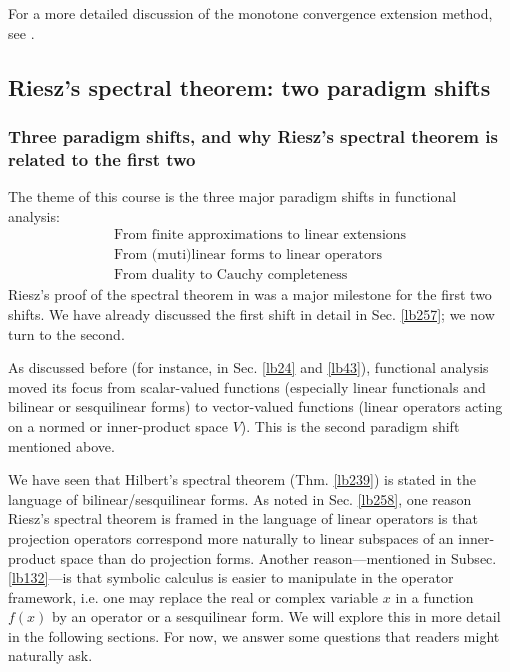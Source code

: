 \documentclass[12pt,b5paper,notitlepage]{article}
\theoremstyle{definition}
\theoremstyle{plain}
\numberwithin{equation}{section}
\begin{document}
For a more detailed discussion of the monotone convergence extension method, see \cite[Ch. 25]{Gui-A}.






\subsection{Riesz's spectral theorem: two paradigm shifts}\label{lb245}

\subsubsection{Three paradigm shifts, and why Riesz's spectral theorem is related to the first two}


The theme of this course is the three major paradigm shifts in functional analysis:
\begin{subequations}\label{eq147}
\begin{gather}
\text{From finite approximations to linear extensions}\label{eq147a}\\
\text{From (muti)linear forms to linear operators}\label{eq147b}\\
\text{From duality to Cauchy completeness}\label{eq147c}
\end{gather}
\end{subequations}
Riesz's proof of the spectral theorem in \cite{Rie13} was a major milestone for the first two shifts. We have already discussed the first shift in detail in Sec. \ref{lb257}; we now turn to the second.


As discussed before (for instance, in Sec. \ref{lb24} and \ref{lb43}), functional analysis moved its focus from scalar-valued functions (especially linear functionals and bilinear or sesquilinear forms) to vector-valued functions (linear operators acting on a normed or inner-product space $V$). This is the second paradigm shift mentioned above.



We have seen that Hilbert's spectral theorem (Thm. \ref{lb239}) is stated in the language of bilinear/sesquilinear forms. As noted in Sec. \ref{lb258}, one reason Riesz's spectral theorem is framed in the language of linear operators is that projection operators correspond more naturally to linear subspaces of an inner-product space than do projection forms. Another reason---mentioned in Subsec. \ref{lb132}---is that symbolic calculus is easier to manipulate in the operator framework, i.e. one may replace the real or complex variable $x$ in a function $f(x)$ by an operator or a sesquilinear form. We will explore this in more detail in the following sections. For now, we answer some questions that readers might naturally ask.
\end{document}
